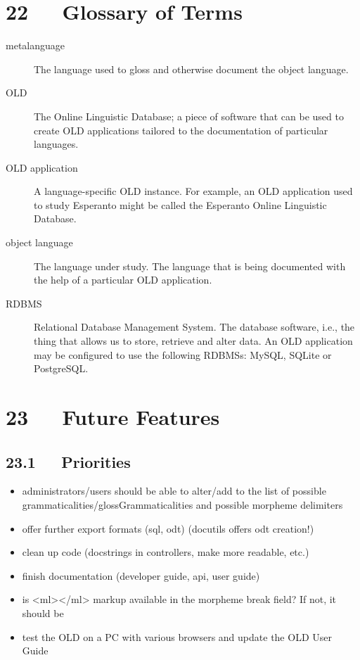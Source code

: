 \documentclass[letterpaper,10pt,english]{sphinxmanual}
\begin{document}
\chapter{22   Glossary of Terms}
\label{documentation:glossary-of-terms}\begin{description}
\item[{metalanguage}] \leavevmode
The language used to gloss and otherwise document the object language.

\item[{OLD}] \leavevmode
The Online Linguistic Database; a piece of software that can be used to
create OLD applications tailored to the documentation of particular
languages.

\item[{OLD application}] \leavevmode
A language-specific OLD instance.  For example, an OLD application used to
study Esperanto might be called the Esperanto Online Linguistic Database.

\item[{object language}] \leavevmode
The language under study.  The language that is being documented with the
help of a particular OLD application.

\item[{RDBMS}] \leavevmode
Relational Database Management System.  The database software, i.e., the
thing that allows us to store, retrieve and alter data.  An OLD application
may be configured to use the following RDBMSs: MySQL, SQLite or PostgreSQL.

\end{description}


\chapter{23   Future Features}
\label{documentation:future-features}

\section{23.1   Priorities}
\label{documentation:priorities}\begin{itemize}
\item {} 
administrators/users should be able to alter/add to the list of possible
grammaticalities/glossGrammaticalities and possible morpheme delimiters

\item {} 
offer further export formats (sql, odt) (docutils offers odt creation!)

\item {} 
clean up code (docstrings in controllers, make more readable, etc.)

\item {} 
finish documentation (developer guide, api, user guide)

\item {} 
is \textless{}ml\textgreater{}\textless{}/ml\textgreater{} markup available in the morpheme break field?  If not, it should
be

\item {} 
test the OLD on a PC with various browsers and update the OLD User Guide

\end{itemize}
\end{document}
